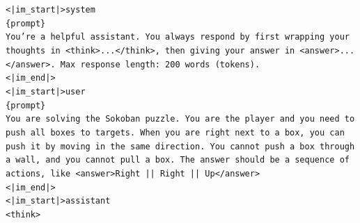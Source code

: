 \begin{tcolorbox}[colback=gray!2, colframe=black, boxrule=0.5pt, arc=2pt, width=0.95\linewidth, title=Model Templates]
\texttt{<|im\_start|>system\\
\{prompt\}\\
You're a helpful assistant. You always respond by first wrapping your thoughts in <think>...</think>, then giving your answer in <answer>...</answer>. Max response length: 200 words (tokens).\\
<|im\_end|>\\
<|im\_start|>user\\
\{prompt\}\\
You are solving the Sokoban puzzle. You are the player and you need to push all boxes to targets. When you are right next to a box, you can push it by moving in the same direction. You cannot push a box through a wall, and you cannot pull a box. The answer should be a sequence of actions, like <answer>Right || Right || Up</answer>\\
<|im\_end|>\\
<|im\_start|>assistant\\
<think>}
\end{tcolorbox}





